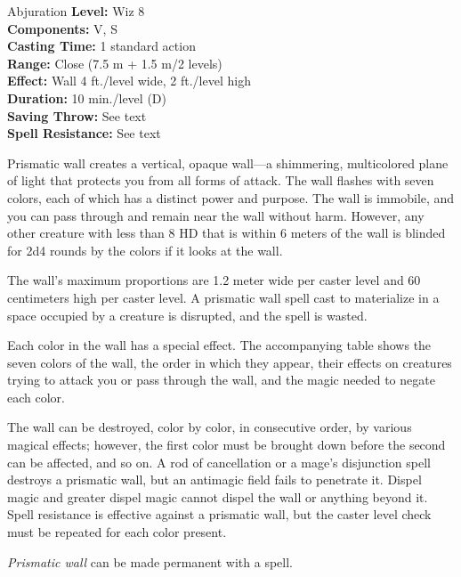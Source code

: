 {Abjuration}
{
	\textbf{Level:}
	Wiz 8\\
	\textbf{Components:}
	V, S\\
	\textbf{Casting Time:}
	1 standard action\\
	\textbf{Range:}
	Close (7.5 m + 1.5 m/2 levels)\\
	\textbf{Effect:}
	Wall 4 ft./level wide, 2 ft./level high\\
	\textbf{Duration:}
	10 min./level (D)\\
	\textbf{Saving Throw:}
	See text\\
	\textbf{Spell Resistance:}
	See text\\
}
{
	Prismatic wall creates a vertical, opaque wall---a shimmering, multicolored plane of light that protects you from all forms of attack. The wall flashes with seven colors, each of which has a distinct power and purpose. The wall is immobile, and you can pass through and remain near the wall without harm. However, any other creature with less than 8 HD that is within 6 meters of the wall is blinded for 2d4 rounds by the colors if it looks at the wall.

	The wall's maximum proportions are 1.2 meter wide per caster level and 60 centimeters high per caster level. A prismatic wall spell cast to materialize in a space occupied by a creature is disrupted, and the spell is wasted.

	Each color in the wall has a special effect. The accompanying table shows the seven colors of the wall, the order in which they appear, their effects on creatures trying to attack you or pass through the wall, and the magic needed to negate each color.

	The wall can be destroyed, color by color, in consecutive order, by various magical effects; however, the first color must be brought down before the second can be affected, and so on. A rod of cancellation or a mage's disjunction spell destroys a prismatic wall, but an antimagic field fails to penetrate it. Dispel magic and greater dispel magic cannot dispel the wall or anything beyond it. Spell resistance is effective against a prismatic wall, but the caster level check must be repeated for each color present.

	\emph{Prismatic wall} can be made permanent with a  spell.
}
